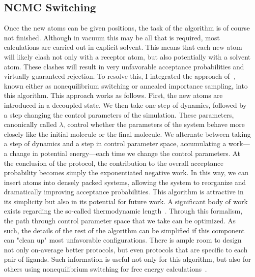 \subsection{NCMC Switching}
%
Once the new atoms can be given positions, the task of the algorithm is of course not finished.
%
Although in vacuum this may be all that is required, most calculations are carried out in explicit solvent.
%
This means that each new atom will likely clash not only with a receptor atom, but also potentially with a solvent atom.
%
These clashes will result in very unfavorable acceptance probabilities and virtually guaranteed rejection.
%
To resolve this, I integrated the approach of~\cite{Nilmeier2011, Neal2001}, known either as nonequilibrium switching or annealed importance sampling, into this algorithm.
%
This approach works as follows. 
%
First, the new atoms are introduced in a decoupled state.
%
We then take one step of dynamics, followed by a step changing the control parameters of the simulation.
%
These parameters, canonically called $\lambda$, control whether the parameters of the system behave more closely like the initial molecule or the final molecule.
%
We alternate between taking a step of dynamics and a step in control parameter space, accumulating a work---a change in potential energy---each time we change the control parameters.
%
At the conclusion of the protocol, the contribution to the overall acceptance probability becomes simply the exponentiated negative work.
%
In this way, we can insert atoms into densely packed systems, allowing the system to reorganize and dramatically improving acceptance probabilities.
%
This algorithm is attractive in its simplicity but also in its potential for future work.
%
A significant body of work exists regarding the so-called thermodynamic length~\cite{Crooks2007}.
%
Through this formalism, the path through control parameter space that we take can be optimized.
%
As such, the details of the rest of the algorithm can be simplified if this component can "clean up" most unfavorable configurations.
%
There is ample room to design not only on-average better protocols, but even protocols that are specific to each pair of ligands.
%
Such information is useful not only for this algorithm, but also for others using nonequilibrium switching for free energy calculations~\cite{Aldeghi2018}.
%
